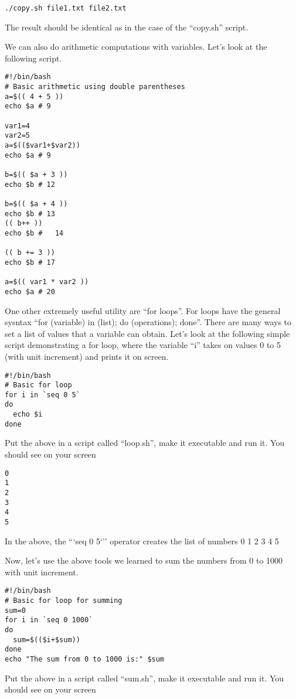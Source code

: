 \documentclass[aps,showpacs,prd,notitlepage,preprintnumbers,amsmath,amssymb,letterpaper]{revtex4}
\begin{document}
\begin{verbatim}
./copy.sh file1.txt file2.txt
\end{verbatim}

The result should be identical as in the case of the ``copy.sh''
script.

We can also do arithmetic computations with variables. Let's look at
the following script.

\begin{verbatim}
#!/bin/bash
# Basic arithmetic using double parentheses
a=$(( 4 + 5 ))
echo $a # 9

var1=4
var2=5
a=$(($var1+$var2))
echo $a # 9

b=$(( $a + 3 ))
echo $b # 12

b=$(( $a + 4 ))
echo $b # 13
(( b++ ))
echo $b #   14

(( b += 3 ))
echo $b # 17

a=$(( var1 * var2 ))
echo $a # 20

\end{verbatim}


One other extremely useful utility are ``for loops''. For loops have
the general sysntax ``for (variable) in (list); do (operations);
done''. There are many ways to set a list of values that a variable
can obtain. Let's look at the following simple script demonstrating a
for loop, where the variable ``i'' takes on values 0 to 5 (with unit
increment) and prints it on screen.

\begin{verbatim}
#!/bin/bash
# Basic for loop
for i in `seq 0 5`
do
  echo $i
done
\end{verbatim}

Put the above in a script called ``loop.sh'', make it executable and
run it. You should see on your screen

\begin{verbatim}
0
1
2
3
4
5
\end{verbatim}

In the above, the ```seq 0 5`'' operator creates the list of numbers 0 1 2 3 4 5

Now, let's use the above tools we learned to sum the numbers from 0 to
1000 with unit increment.

\begin{verbatim}
#!/bin/bash
# Basic for loop for summing
sum=0
for i in `seq 0 1000`
do
  sum=$(($i+$sum))
done
echo "The sum from 0 to 1000 is:" $sum
\end{verbatim}

Put the above in a script called ``sum.sh'', make it executable and
run it. You should see on your screen
\end{document}
